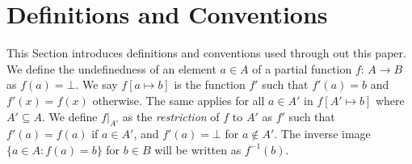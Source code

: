 \section{Definitions and Conventions}
\label{sec:definitions}

This Section introduces definitions and conventions used through out this paper.
We define the undefinedness of an element $a \in A$ of a partial function $f$: $A \rightarrow B$ as
$f(a) = \bot$. We say $f[a \mapsto b]$ is the function $f'$ such that $f'(a) = b$ and
$f'(x) = f(x)$ otherwise. The same applies for all $a \in A'$ in $f[A' \mapsto b]$ where $A' \subseteq A$.
We define $f|_{A'}$ as the \textit{restriction} of $f$ to $A'$ as $f'$ such that
$f'(a) = f(a)$ if $a \in A'$, and $f'(a) = \bot$ for $a \not\in A'$. The inverse image
$\{ a \in A : f(a) = b\}$ for $b \in B$ will be written as $f^{-1}(b)$.


